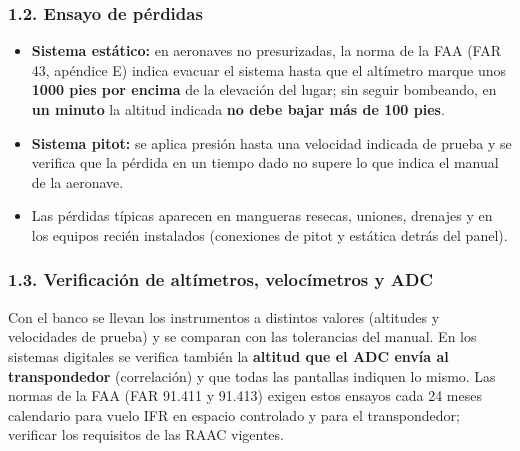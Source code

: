 \subsubsection*{1.2. Ensayo de pérdidas}
\begin{itemize}
  \item \textbf{Sistema estático:} en aeronaves no presurizadas, la norma de la FAA (FAR 43,
        apéndice E) indica evacuar el sistema hasta que el altímetro marque unos \textbf{1000 pies
        por encima} de la elevación del lugar; sin seguir bombeando, en \textbf{un minuto} la
        altitud indicada \textbf{no debe bajar más de 100 pies}.
  \item \textbf{Sistema pitot:} se aplica presión hasta una velocidad indicada de prueba y se
        verifica que la pérdida en un tiempo dado no supere lo que indica el manual de la
        aeronave.
  \item Las pérdidas típicas aparecen en mangueras resecas, uniones, drenajes y en los equipos
        recién instalados (conexiones de pitot y estática detrás del panel).
\end{itemize}

\subsubsection*{1.3. Verificación de altímetros, velocímetros y ADC}
Con el banco se llevan los instrumentos a distintos valores (altitudes y velocidades de prueba) y
se comparan con las tolerancias del manual. En los sistemas digitales se verifica también la
\textbf{altitud que el ADC envía al transpondedor} (correlación) y que todas las pantallas indiquen
lo mismo. Las normas de la FAA (FAR 91.411 y 91.413) exigen estos ensayos cada 24 meses calendario
para vuelo IFR en espacio controlado y para el transpondedor; verificar los requisitos de las RAAC
vigentes.

